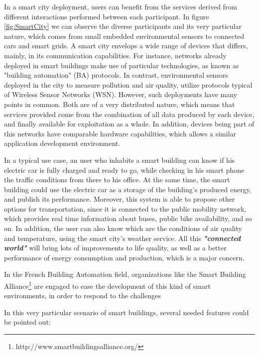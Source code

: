 In a smart city deployment\cite{smartsantander}, users can benefit from the services derived from different interactions performed between each participant.
In figure \ref{fig:SmartCity} we can observe the diverse participants and its very particular nature, which comes from small embedded environmental sensors to connected cars and smart grids.
A smart city envelops a wide range of devices that differs, mainly, in its communication capabilities.
For instance, networks already deployed in smart buildings make use of particular technologies, as known as "building automation" (BA) protocols.
In contrast, environmental sensors deployed in the city to measure pollution and air quality, utilize protocols typical of Wireless Sensor Networks (WSN)\cite{Akyildiz2002WSN}.
However, such deployments have many points in common.
Both are of a very distributed nature, which means that services provided come from the combination of all data produced by each device, and finally available for exploitation as a whole.
In addition, devices being part of this networks have comparable hardware capabilities, which allows a similar application development environment.

In a typical use case, an user who inhabits a smart building can know if his electric car is fully charged and ready to go, while checking in his smart phone the traffic conditions from there to his office.
At the same time, the smart building could use the electric car as a storage of the building's produced energy, and publish its performance.
Moreover, this system is able to propose other options for transportation, since it is connected to the public mobility network, which provides real time information about buses, public bike availability, and so on.
In addition, the user can also know which are the conditions of air quality and temperature, using the smart city's weather service.
All this \textit{\textbf{"connected world"}} will bring lots of improvements to life quality, as well as a better performance of energy consumption and production, which is a major concern.

In the French Building Automation field, organizations like the Smart Building Alliance\footnote{http://www.smartbuildingsalliance.org/} are engaged to ease the development of this kind of smart environments, in order to respond to the challenges 

In this very particular scenario of smart buildings, several needed features could be pointed out:

